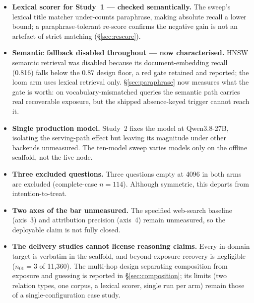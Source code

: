 \documentclass[10pt,twocolumn]{article}
\begin{document}
\begin{itemize}[topsep=2pt,itemsep=2pt,leftmargin=1.4em]
\item \textbf{Lexical scorer for Study~1 --- checked semantically.} The sweep's lexical title matcher under-counts paraphrase, making absolute recall a lower bound; a paraphrase-tolerant re-score confirms the negative gain is not an artefact of strict matching (\S\ref{sec:rescore}).
\item \textbf{Semantic fallback disabled throughout --- now characterised.} HNSW semantic retrieval was disabled because its document-embedding recall (0.816) falls below the 0.87 design floor, a red gate retained and reported; the loom arm uses lexical retrieval only. \S\ref{sec:paraphrase} now measures what the gate is worth: on vocabulary-mismatched queries the semantic path carries real recoverable exposure, but the shipped absence-keyed trigger cannot reach it.
\item \textbf{Single production model.} Study~2 fixes the model at Qwen3.8-27B, isolating the serving-path effect but leaving its magnitude under other backends unmeasured. The ten-model sweep varies models only on the offline scaffold, not the live node.
\item \textbf{Three excluded questions.} Three questions empty at 4096 in both arms are excluded (complete-case $n=114$). Although symmetric, this departs from intention-to-treat.
\item \textbf{Two axes of the bar unmeasured.} The specified web-search baseline (axis~3) and attribution precision (axis~4) remain unmeasured, so the deployable claim is not fully closed.
\item \textbf{The delivery studies cannot license reasoning claims.} Every in-domain target is verbatim in the scaffold, and beyond-exposure recovery is negligible ($n_{01}=3$ of 11{,}360). The multi-hop design separating composition from exposure and guessing is reported in \S\ref{sec:composition}; its limits (two relation types, one corpus, a lexical scorer, single run per arm) remain those of a single-configuration case study.
\end{itemize}
\end{document}
